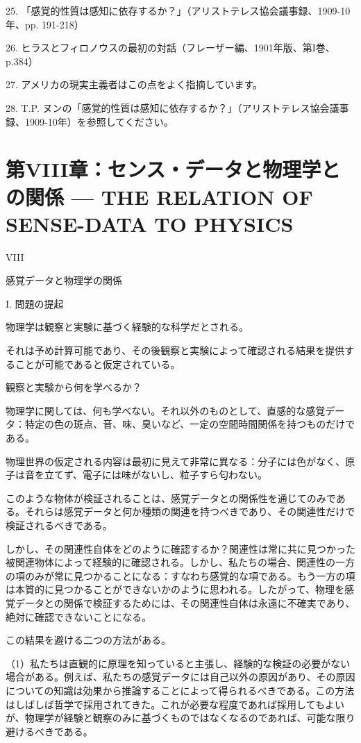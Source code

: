 \documentclass[a4paper,11pt,openany]{ltjsbook}
\begin{document}
25. 「感覚的性質は感知に依存するか？」（アリストテレス協会議事録、1909-10年、pp. 191-218）

26. ヒラスとフィロノウスの最初の対話（フレーザー編、1901年版、第I巻、p.384）

27. アメリカの現実主義者はこの点をよく指摘しています。

28. T.P. ヌンの「感覚的性質は感知に依存するか？」（アリストテレス協会議事録、1909-10年）を参照してください。


\chapter{第VIII章：センス・データと物理学との関係 --- {THE RELATION OF SENSE-DATA TO PHYSICS}}

VIII

感覚データと物理学の関係


I. 問題の提起

物理学は観察と実験に基づく経験的な科学だとされる。

それは予め計算可能であり、その後観察と実験によって確認される結果を提供することが可能であると仮定されている。

観察と実験から何を学べるか？

物理学に関しては、何も学べない。それ以外のものとして、直感的な感覚データ：特定の色の斑点、音、味、臭いなど、一定の空間時間関係を持つものだけである。

物理世界の仮定される内容は最初に見えて非常に異なる：分子には色がなく、原子は音を立てず、電子には味がないし、粒子すら匂わない。

このような物体が検証されることは、感覚データとの関係性を通じてのみである。それらは感覚データと何か種類の関連を持つべきであり、その関連性だけで検証されるべきである。

しかし、その関連性自体をどのように確認するか？関連性は常に共に見つかった被関連物体によって経験的に確認される。しかし、私たちの場合、関連性の一方の項のみが常に見つかることになる：すなわち感覚的な項である。もう一方の項は本質的に見つかることができないかのように思われる。したがって、物理を感覚データとの関係で検証するためには、その関連性自体は永遠に不確実であり、絶対に確認できないことになる。

この結果を避ける二つの方法がある。

（1）私たちは直観的に原理を知っていると主張し、経験的な検証の必要がない場合がある。例えば、私たちの感覚データには自己以外の原因があり、その原因についての知識は効果から推論することによって得られるべきである。この方法はしばしば哲学で採用されてきた。これが必要な程度であれば採用してもよいが、物理学が経験と観察のみに基づくものではなくなるのであれば、可能な限り避けるべきである。
\end{document}
